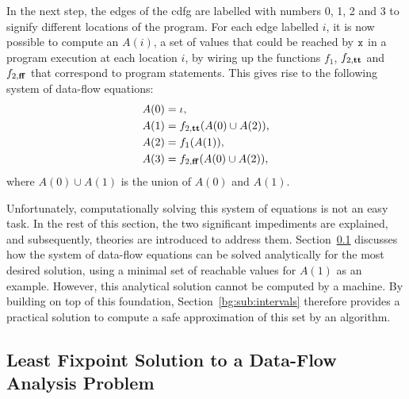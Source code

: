 In the next step, the edges of the \gls{cdfg} are labelled with numbers 0, 1,
2 and 3 to signify different locations of the program.  For each edge labelled
$i$, it is now possible to compute an $A(i)$, a set of values that could be
reached by $\texttt{x}$ in a program execution at each location $i$, by wiring up
the functions $f_1$, $f_{2, \mathbf{tt}}$ and $f_{2, \mathbf{ff}}$ that correspond
to program statements.  This gives rise to the following system of data-flow
equations:
\begin{align}
    A(0) &= \iota,
        \label{bg:eq:dfa0} \\
    A(1) &= f_{2, \mathbf{tt}}(A(0) \cup A(2)),
        \label{bg:eq:dfa1} \\
    A(2) &= f_1(A(1)),
        \label{bg:eq:dfa2} \\
    A(3) &= f_{2, \mathbf{ff}}(A(0) \cup A(2)),
        \label{bg:eq:dfa3}
\end{align}
where $A(0) \cup A(1)$ is the union of $A(0)$ and $A(1)$.

Unfortunately, computationally solving this system of equations is not an
easy task.  In the rest of this section, the two significant impediments
are explained, and subsequently, theories are introduced to address them.
Section~\ref{bg:sub:lfp} discusses how the system of data-flow equations can
be solved analytically for the most desired solution, using a minimal set of
reachable values for $A(1)$ as an example.  However, this analytical solution
cannot be computed by a machine.  By building on top of this foundation,
Section~\ref{bg:sub:intervals} therefore provides a practical solution to
compute a safe approximation of this set by an algorithm.


\subsection{Least Fixpoint Solution to a Data-Flow Analysis Problem}
\label{bg:sub:lfp}

